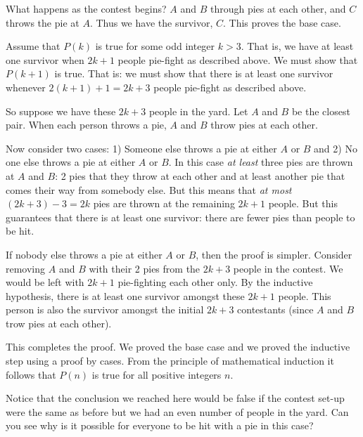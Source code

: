 \documentclass{tufte-handout}
\begin{document}
  What happens as the contest begins? $A$ and $B$ through pies at each other, and $C$ throws the pie at $A$. Thus we have the survivor, $C$. This proves the base case.
  
      

 Assume that $P(k)$ is true for some odd integer $k > 3$. That is, we have at least one survivor when $2k + 1$ people pie-fight as described above. We must show that $P(k+1)$ is true. That is: we must show that there is at least one survivor whenever $2(k+1) + 1 = 2k + 3$ people pie-fight as described above.  

\bigskip
So suppose we have these $2k + 3$ people in the yard. Let $A$ and $B$ be the closest pair. When each person throws a pie, $A$ and $B$ throw pies at each other. 

\bigskip Now consider two cases: 1) Someone else throws a pie at either $A$ or $B$ and 2) No one else throws a pie  at either $A$ or $B$.
 In this case \textit{at least } three pies are thrown at $A$ and $B$: 2 pies that they throw at each other and at least another pie that comes their way from somebody else. But this means that \textit{at most } $(2k+3) - 3 = 2k$ pies are thrown at the remaining $2k + 1$ people. But this guarantees that there is at least one survivor: there are fewer pies than people to be hit. 

 If nobody else throws a pie at either $A$ or $B$, then the proof is simpler. Consider removing $A$ and $B$ with their 2 pies from the $2k + 3$ people in the contest. We would be left with $2k + 1$ pie-fighting each other only. By the inductive hypothesis, there is at least one survivor amongst these $2k+1$ people. This person is also the survivor amongst the initial $2k + 3$ contestants (since $A$ and $B$ trow pies at each other).

\bigskip
This completes the proof. We proved the base case and we proved the inductive step using a proof by cases. From the principle of mathematical induction it follows that $P(n)$ is true for all positive integers $n$. 

\bigskip
Notice that the conclusion we reached here would be false if the contest set-up were the same as before but we had an even number of people in the yard. Can you see why is it possible for everyone to be hit with a pie in this case?
\end{document}
